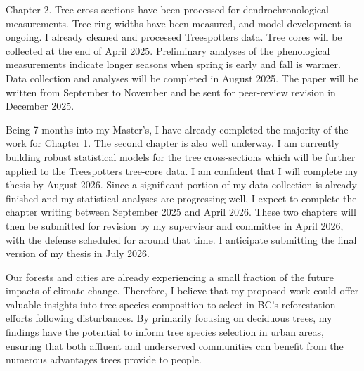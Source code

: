 \documentclass[11pt,letter]{article}
\begin{document}
Chapter 2. Tree cross-sections have been processed for dendrochronological measurements. Tree ring widths have been measured, and model development is ongoing. I already cleaned and processed Treespotters data. Tree cores will be collected at the end of April  2025. Preliminary analyses of the phenological measurements indicate longer seasons when spring is early and fall is warmer. Data collection and analyses will be completed in August 2025. The paper will be written from September to November and be sent for peer-review revision in December 2025.

Being 7 months into my Master’s, I have already completed the majority of the work for Chapter 1. The second chapter is also well underway. I am currently building robust statistical models for the tree cross-sections which will be further applied to the Treespotters tree-core data. 
I am confident that I will complete my thesis by August 2026. Since a significant portion of my data collection is already finished and my statistical analyses are progressing well, I expect to complete the chapter writing between September 2025 and April 2026. These two chapters will then be submitted for revision by my supervisor and committee in April 2026, with the defense scheduled for around that time. I anticipate submitting the final version of my thesis in July 2026.

Our forests and cities are already experiencing a small fraction of the future impacts of climate change. Therefore, I believe that my proposed work could offer valuable insights into tree species composition to select in BC's reforestation efforts following disturbances. By primarily focusing on deciduous trees, my findings have the potential to inform tree species selection in urban areas, ensuring that both affluent and underserved communities can benefit from the numerous advantages trees provide to people.

\end{document}
